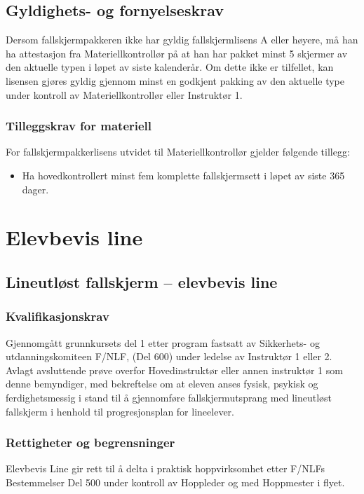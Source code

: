\subsection{Gyldighets- og fornyelseskrav}
Dersom fallskjermpakkeren ikke har gyldig fallskjermlisens A eller høyere, må han ha attestasjon fra Materiellkontrollør på at han har pakket minst 5 skjermer av den aktuelle typen i løpet av siste kalenderår. Om dette ikke er tilfellet, kan lisensen gjøres gyldig gjennom minst en godkjent pakking av den aktuelle type under kontroll av Materiellkontrollør eller Instruktør 1.

\subsubsection{Tilleggskrav for materiell}
For fallskjermpakkerlisens utvidet til Materiellkontrollør gjelder følgende tillegg:
\begin{itemize}
	\item Ha hovedkontrollert minst fem komplette fallskjermsett i løpet av siste 365 dager.
\end{itemize}

\section{Elevbevis line}
\subsection{Lineutløst fallskjerm – elevbevis line}
\subsubsection{Kvalifikasjonskrav}
Gjennomgått grunnkursets del 1 etter program fastsatt av Sikkerhets- og utdanningskomiteen F/NLF, (Del 600) under ledelse av Instruktør 1 eller 2. Avlagt avsluttende prøve overfor Hovedinstruktør eller annen instruktør 1 som denne bemyndiger, med bekreftelse om at eleven anses fysisk, psykisk og ferdighetsmessig i stand til å gjennomføre fallskjermutsprang med lineutløst fallskjerm i henhold til progresjonsplan for lineelever.

\subsubsection{Rettigheter og begrensninger}
Elevbevis Line gir rett til å delta i praktisk hoppvirksomhet etter F/NLFs Bestemmelser Del 500 under kontroll av Hoppleder og med Hoppmester i flyet.

